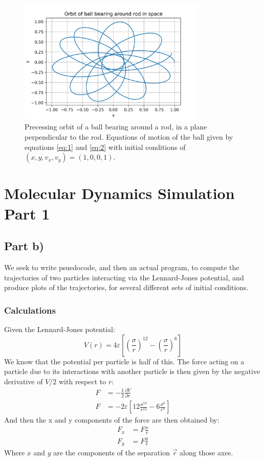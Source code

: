 \documentclass{article}
\begin{document}
\begin{figure}[H]
	\centering
	\includegraphics[width=0.8\textwidth]{../images/q1_orbit.png}
	\caption{Precessing orbit of a ball bearing around a rod, in a plane perpendicular to the rod. Equations of motion of the ball given by equations \ref{eq:1} and \ref{eq:2} with initial conditions of $(x,y,v_x,v_y)=(1,0,0,1)$.}
	\label{fig:q1_orbit}
\end{figure}

\section{Molecular Dynamics Simulation Part 1}

\subsection{Part b)}

We seek to write psuedocode, and then an actual program, to compute the trajectories of two particles interacting via the Lennard-Jones potential, and produce plots of the trajectories, for several different sets of initial conditions.

\subsubsection{Calculations}

Given the Lennard-Jones potential:
\begin{equation*}
	V(r) = 4\varepsilon\left[\left(\frac{\sigma}{r}\right)^{12} - \left(\frac{\sigma}{r}\right)^6\right]
\end{equation*}
We know that the potential per particle is half of this. The force acting on a particle due to its interactions with another particle is then given by the negative derivative of $V/2$ with respect to $r$:
\begin{align*}
	F &= -\frac{1}{2}\frac{\partial V}{\partial r} \\
	F &= -2\varepsilon \left[ 12\frac{\sigma^{12}}{r^{13}} - 6\frac{\sigma^{6}}{r^{7}} \right]
\end{align*}
And then the x and y components of the force are then obtained by:
\begin{align*}
	F_x &= F\frac{x}{r} \\
	F_y &= F\frac{y}{r}
\end{align*}
Where $x$ and $y$ are the components of the separation $\vec{r}$ along those axes. 
\end{document}
